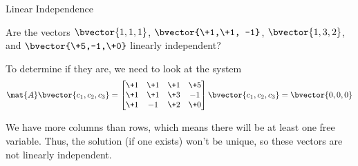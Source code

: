 \documentclass{beamer}
\begin{document}
\begin{frame}{Linear Independence}
\begin{example}
Are the vectors $\bvector{1,1,1}$, $\bvector{\+1,\+1, -1}$, $\bvector{1,3,2}$, and $\bvector{\+5,-1,\+0}$ linearly independent?\pause

To determine if they are, we need to look at the system
\begin{equation*}
\mat{A}\bvector{c_1,c_2,c_3}=
\begin{bmatrix}
\+1 & \+1 & \+1 & \+5 \\
\+1 & \+1 & \+3 &  -1 \\
\+1 &  -1 & \+2 & \+0 \\
\end{bmatrix}
\bvector{c_1,c_2,c_3}=\bvector{0,0,0}
\end{equation*}\pause

We have more columns than rows, which means there will be at least one free variable. Thus, the solution (if one exists) won't be unique, so these vectors are not linearly independent.
\end{example}
\end{frame}
\end{document}
